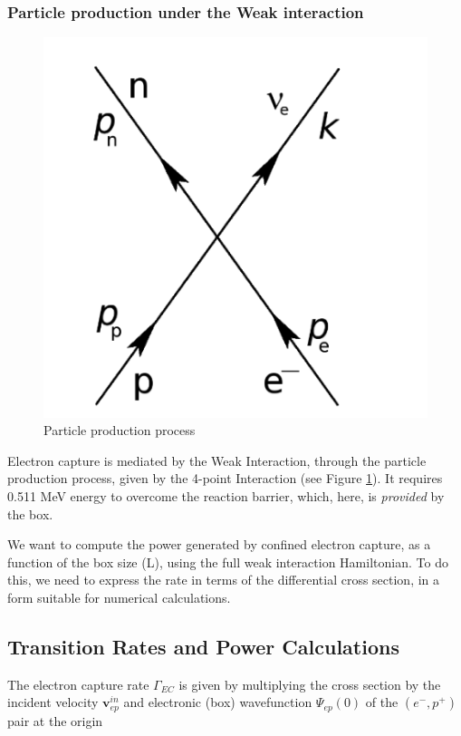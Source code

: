 \documentclass[11pt]{amsart}
\begin{document}
\subsubsection{Particle production under the Weak interaction}

\begin{figure}
   \includegraphics[scale=0.25]{img/feynman.png}
   \caption{Particle production process}
  \label{fig:ppp}
\end{figure}

Electron capture is mediated by the Weak Interaction, through the particle production process, given by the 4-point Interaction (see Figure \ref{fig:ppp}).   It requires 0.511 MeV energy to overcome the reaction barrier, which, here, is \emph{provided} by the box. \

We want to compute the power generated by confined electron capture, as a function of the box size (L), using the full weak interaction Hamiltonian.  To do this, we need to express the rate in terms of the differential cross section, in a form suitable for numerical calculations.  

\subsection{Transition Rates and Power Calculations}

The electron capture rate $\Gamma_{EC}$  is given by multiplying the cross section by the incident velocity $\mathbf{v}^{in}_{ep}$ and electronic (box) wavefunction  $\Psi_{ep}(0)$  of the $(e^{-},p^{+})$ pair at the origin
\end{document}
